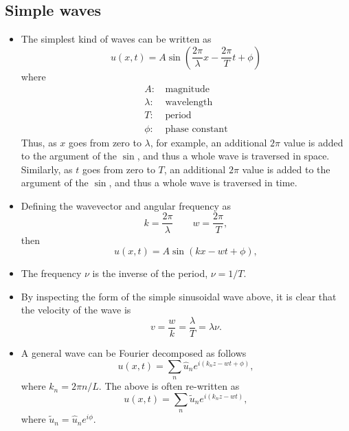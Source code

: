 \documentclass[a4paper,11pt]{report}
\begin{document}
\subsection{Simple waves}
\begin{itemize}
\item The simplest kind of waves can be written as
\begin{equation}
    u(x,t) = A \sin\left ( \frac{2 \pi}{\lambda}x - \frac{2 \pi}{T} t +\phi \right)
\end{equation}
where
\begin{align*}
    A:&\, \text{magnitude} \\
    \lambda:&\, \text{wavelength} \\
    T:&\, \text{period} \\
    \phi:&\, \text{phase constant}
\end{align*}
Thus, as $x$ goes from zero to $\lambda$, for example, an additional $2\pi$ value is added to the argument of the $\sin$, and thus a whole wave is traversed in space. Similarly, as $t$ goes from zero to $T$, an additional $2\pi$ value is added to the argument of the $\sin$, and thus a whole wave is traversed in time.

\item Defining the wavevector and angular frequency as
\begin{equation}
    k = \frac{2 \pi}{\lambda} \qquad w = \frac{2 \pi}{T},
\end{equation}
then
\begin{equation}
    u(x,t) = A \sin(kx - wt + \phi),
\end{equation}

\item The frequency $\nu$ is the inverse of the period, $\nu = 1/T$.

\item By inspecting the form of the simple sinusoidal wave above, it is clear that the velocity of the wave is
\begin{equation}
    v = \frac{w}{k} = \frac{\lambda}{T} = \lambda \nu.
\end{equation}

\item A general wave can be Fourier decomposed as follows
\begin{equation}
    u(x,t) = \sum_n \hat{u}_n e^{i \left ( k_n z - wt + \phi \right )},
\end{equation}
where $k_n = 2 \pi n/ L$. The above is often re-written as
\begin{equation}
    u(x,t) = \sum_n \tilde{u}_n e^{i \left ( k_n z - wt \right )},
\end{equation}
where $\tilde{u}_n = \hat{u}_n e^{i\phi}$.


\end{itemize}
\end{document}
